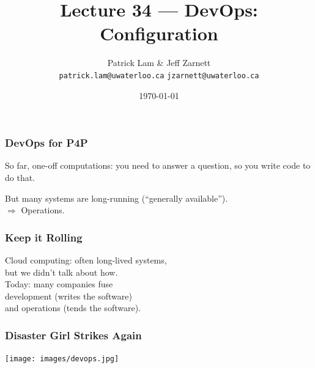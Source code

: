 

\title{Lecture 34 --- DevOps: Configuration }

\author{Patrick Lam \& Jeff Zarnett \\ \small \texttt{patrick.lam@uwaterloo.ca} \texttt{jzarnett@uwaterloo.ca}}
\date{\today}




\begin{frame}
  \titlepage

 \end{frame}



\begin{frame}
\frametitle{DevOps for P4P}

\large

So far, one-off computations:
you need to answer a question, so you write code to do that.

But many systems are long-running (``generally available'').\\
$\Rightarrow$ Operations.

\end{frame}



\begin{frame}
\frametitle{Keep it Rolling}

\Large
Cloud computing: often long-lived systems,\\
but we didn't talk about how.\\[1em]
Today: many companies fuse\\
development (writes the software) \\
and operations (tends the software).

\end{frame}



\begin{frame}
\frametitle{Disaster Girl Strikes Again}

\begin{center}
	\texttt{[image: images/devops.jpg]}
\end{center}

\end{frame}



